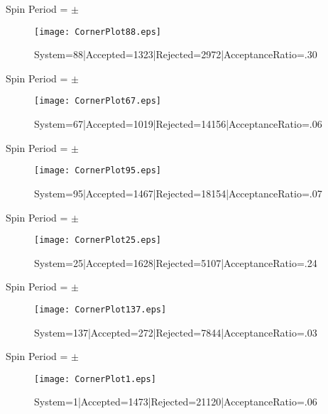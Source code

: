 \documentclass[10pt]{article}
\begin{document}
\begin{center}
        Spin Period = $\pm$ 
\begin{figure}[h] 
        \texttt{[image: CornerPlot88.eps]}
        \caption{System=88|Accepted=1323|Rejected=2972|AcceptanceRatio=.30}
        \label{S88}
        \centering
        \end{figure}
        \end{center}
\begin{center}
        Spin Period = $\pm$ 
\begin{figure}[h] 
        \texttt{[image: CornerPlot67.eps]}
        \caption{System=67|Accepted=1019|Rejected=14156|AcceptanceRatio=.06}
        \label{S67}
        \centering
        \end{figure}
        \end{center}
\begin{center}
        Spin Period = $\pm$ 
\begin{figure}[h] 
        \texttt{[image: CornerPlot95.eps]}
        \caption{System=95|Accepted=1467|Rejected=18154|AcceptanceRatio=.07}
        \label{S95}
        \centering
        \end{figure}
        \end{center}
\begin{center}
        Spin Period = $\pm$ 
\begin{figure}[h] 
        \texttt{[image: CornerPlot25.eps]}
        \caption{System=25|Accepted=1628|Rejected=5107|AcceptanceRatio=.24}
        \label{S25}
        \centering
        \end{figure}
        \end{center}
\begin{center}
        Spin Period = $\pm$ 
\begin{figure}[h] 
        \texttt{[image: CornerPlot137.eps]}
        \caption{System=137|Accepted=272|Rejected=7844|AcceptanceRatio=.03}
        \label{S137}
        \centering
        \end{figure}
        \end{center}
\begin{center}
        Spin Period = $\pm$ 
\begin{figure}[h] 
        \texttt{[image: CornerPlot1.eps]}
        \caption{System=1|Accepted=1473|Rejected=21120|AcceptanceRatio=.06}
        \label{S1}
        \centering
        \end{figure}
        \end{center}
\end{document}
